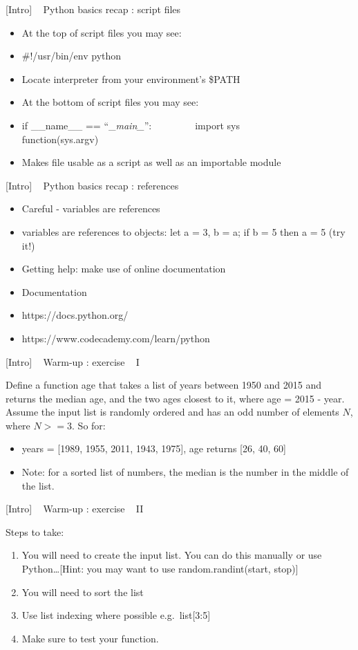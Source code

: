 \documentclass{article}
\begin{document}
    {[}Intro{]} ~ Python basics recap : script files

\begin{itemize}
\item
  At the top of script files you may see:
\item
  \#!/usr/bin/env python 
\item
  Locate interpreter from your environment's \$PATH
\item
  At the bottom of script files you may see:
\item
  if \_\_name\_\_ == ``\_\emph{main\_}'': ~ ~ ~ ~ ~ import sys ~ ~ ~ ~ ~
  function(sys.argv)
\item
  Makes file usable as a script as well as an importable module
\end{itemize}

    {[}Intro{]} ~ Python basics recap : references

\begin{itemize}
\item
  Careful - variables are references
\item
  variables are references to objects: let a = 3, b = a; if b = 5 then a
  = 5 (try it!)
\item
  Getting help: make use of online documentation
\item
  Documentation
\item
  https://docs.python.org/
\item
  https://www.codecademy.com/learn/python
\end{itemize}

    {[}Intro{]} ~ Warm-up : exercise ~ I

Define a function age that takes a list of years between 1950 and 2015
and returns the median age, and the two ages closest to it, where age =
2015 - year. Assume the input list is randomly ordered and has an odd
number of elements $N$, where $N >= 3$. So for:

\begin{itemize}
\itemsep1pt\parskip0pt
\item
  years = {[}1989, 1955, 2011, 1943, 1975{]}, age returns {[}26, 40,
  60{]}
\item
  Note: for a sorted list of numbers, the median is the number in the
  middle of the list.
\end{itemize}

    {[}Intro{]} ~ Warm-up : exercise ~ II

Steps to take:

\begin{enumerate}
\def\labelenumi{\arabic{enumi}.}
\itemsep1pt\parskip0pt
\item
  You will need to create the input list. You can do this manually or
  use Python\ldots{}{[}Hint: you may want to use random.randint(start,
  stop){]}
\item
  You will need to sort the list
\item
  Use list indexing where possible e.g.~list{[}3:5{]}
\item
  Make sure to test your function.
\end{enumerate}
\end{document}
